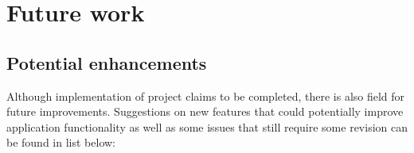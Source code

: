 %
\section{Future work}
\label{sec:ch8_future_work}

\subsection{Potential enhancements}

Although implementation of project claims to be completed, there is also field for future improvements. Suggestions on new features that could potentially improve application functionality as well as some issues that still require some revision can be found in list below:

